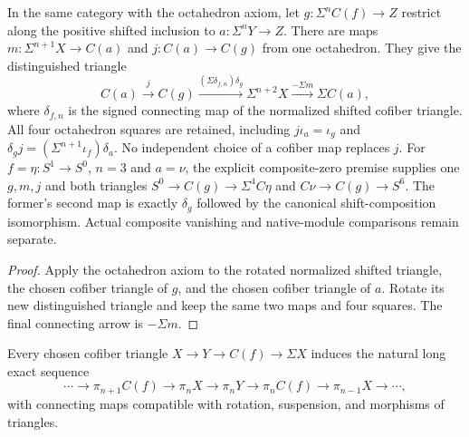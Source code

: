 \begin{proposition}
  \label{prop:cofiber-extension-octahedron}
  \leanok
  In the same category with the octahedron axiom, let
  $g:\Sigma^n C(f)\to Z$ restrict along the positive shifted inclusion
  to $a:\Sigma^nY\to Z$. There are maps
  $m:\Sigma^{n+1}X\to C(a)$ and $j:C(a)\to C(g)$ from one octahedron.
  They give the distinguished triangle
  \[
    C(a)\xrightarrow{j} C(g)
      \xrightarrow{(\Sigma\delta_{f,n})\delta_g}
      \Sigma^{n+2}X\xrightarrow{-\Sigma m}\Sigma C(a),
  \]
  where $\delta_{f,n}$ is the signed connecting map of the normalized
  shifted cofiber triangle. All four octahedron squares are retained,
  including $j\iota_a=\iota_g$ and
  $\delta_gj=(\Sigma^{n+1}\iota_f)\delta_a$.
  No independent choice of a cofiber map replaces $j$.
  For $f=\eta:S^1\to S^0$, $n=3$ and $a=\nu$, the explicit composite-zero
  premise supplies one $g,m,j$ and both triangles
  $S^0\to C(g)\to\Sigma^4C\eta$ and
  $C\nu\to C(g)\to S^6$. The former's second map is exactly
  $\delta_g$ followed by the canonical shift-composition isomorphism.
  Actual composite vanishing and native-module comparisons remain separate.
\end{proposition}
\begin{proof}
  \leanok
  Apply the octahedron axiom to the rotated normalized shifted triangle,
  the chosen cofiber triangle of $g$, and the chosen cofiber triangle of
  $a$. Rotate its new distinguished triangle and keep the same two maps
  and four squares. The final connecting arrow is $-\Sigma m$.
\end{proof}

\begin{theorem}
  \label{thm:stable-homotopy-long-exact}
  \notready
  Every chosen cofiber triangle
  $X\to Y\to C(f)\to\Sigma X$ induces the natural long exact sequence
  \[
    \cdots\to\pi_{n+1}C(f)\to\pi_nX\to\pi_nY
      \to\pi_nC(f)\to\pi_{n-1}X\to\cdots,
  \]
  with connecting maps compatible with rotation, suspension, and morphisms of
  triangles.
\end{theorem}


